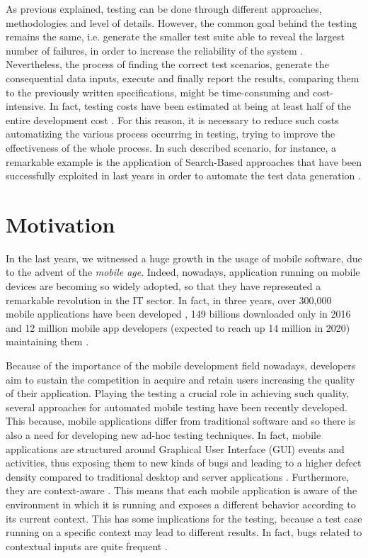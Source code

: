 As previous explained, testing can be done through different approaches, methodologies and level of details. However, the common goal behind the testing remains the same, i.e. generate the smaller test suite able to reveal the largest number of failures, in order to increase the reliability of the system \cite{grano}. 
Nevertheless, the process of finding the correct test scenarios, generate the consequential data inputs, execute and finally report the results, comparing them to the previously written specifications, might be time-consuming and cost-intensive. In fact, testing costs have been estimated at being at least half of the entire development cost \cite{Beizer:1990:STT:79060}. For this reason, it is necessary to reduce such costs automatizing the various process occurring in testing, trying to improve the effectiveness of the whole process. In such described scenario, for instance, a remarkable example is the application of Search-Based approaches that have been successfully exploited in last years in order to automate the test data generation \cite{Harman_et_al_2015}.

\section{Motivation}
In the last years, we witnessed a huge growth in the usage of mobile software, due to the advent of the \textit{mobile age}. Indeed, nowadays, application running on mobile devices are becoming so widely adopted, so that they have represented a remarkable revolution in the IT sector. In fact, in three years, over 300,000 mobile applications have been developed \cite{muccini}, 149 billions downloaded only in 2016 \cite{statista} and 12 million mobile app developers (expected to reach up 14 million in 2020) maintaining them \cite{DevRelate}. 

Because of the importance of the mobile development field nowadays, developers aim to sustain the competition in acquire and retain users increasing the quality of their application. Playing the testing a crucial role in achieving such quality, several approaches for automated mobile testing have been recently developed. This because, mobile applications differ from traditional software and so there is also a need for developing new ad-hoc testing techniques. 
In fact, mobile applications are structured around Graphical User Interface (GUI) events and activities, thus exposing them to new kinds of bugs and leading to a higher defect density compared to traditional desktop and server applications \cite{Hu:2011:AGT:1982595.1982612}. Furthermore, they are context-aware \cite{muccini}. 
This means that each mobile application is aware of the environment in which it is running and exposes a different behavior according to its current context. This has some implications for the testing, because a test case running on a specific context may lead to different results. In fact, bugs related to contextual inputs are quite frequent \cite{muccini}. 

